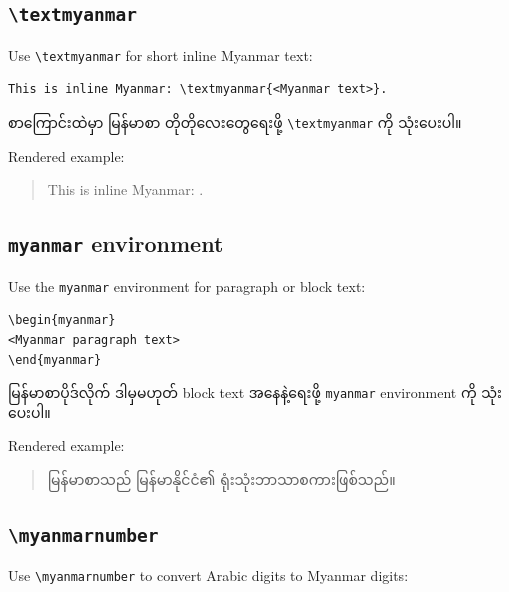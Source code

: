 \documentclass[a4paper,11pt]{article}
\newcommand{\cmd}[1]{\texttt{\textbackslash #1}}
\newenvironment{burmese}
  {\par\smallskip\begin{myanmar}\sloppy}
  {\par\end{myanmar}\fussy\smallskip}
\begin{document}
\subsection{\cmd{textmyanmar}}

Use \cmd{textmyanmar} for short inline Myanmar text:

\begin{Verbatim}
This is inline Myanmar: \textmyanmar{<Myanmar text>}.
\end{Verbatim}

\begin{burmese}
စာကြောင်းထဲမှာ မြန်မာစာ တိုတိုလေးတွေရေးဖို့ \cmd{textmyanmar} ကို သုံးပေးပါ။
\end{burmese}

Rendered example:

\begin{quote}
This is inline Myanmar: .
\end{quote}

\subsection{\texttt{myanmar} environment}

Use the \texttt{myanmar} environment for paragraph or block text:

\begin{Verbatim}
\begin{myanmar}
<Myanmar paragraph text>
\end{myanmar}
\end{Verbatim}

\begin{burmese}
မြန်မာစာပိုဒ်လိုက် ဒါမှမဟုတ် block text အနေနဲ့ရေးဖို့ \texttt{myanmar} environment 
ကို သုံးပေးပါ။
\end{burmese}

Rendered example:

\begin{quote}
\begin{myanmar}
မြန်မာစာသည် မြန်မာနိုင်ငံ၏ ရုံးသုံးဘာသာစကားဖြစ်သည်။
\end{myanmar}
\end{quote}

\subsection{\cmd{myanmarnumber}}

Use \cmd{myanmarnumber} to convert Arabic digits to Myanmar digits:
\end{document}
